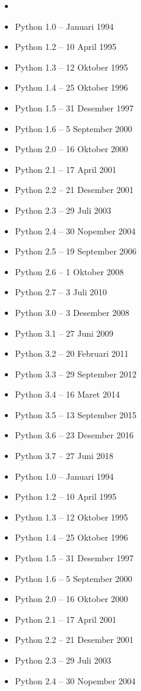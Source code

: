 \begin{itemize}
    \item 
\item    Python 1.0 – Januari 1994
\item	 Python 1.2 – 10 April 1995
\item    Python 1.3 – 12 Oktober 1995
\item    Python 1.4 – 25 Oktober 1996
\item 	 Python 1.5 – 31 Desember 1997
\item    Python 1.6 – 5 September 2000
\item  	 Python 2.0 – 16 Oktober 2000
\item 	 Python 2.1 – 17 April 2001
\item 	 Python 2.2 – 21 Desember 2001
\item  	 Python 2.3 – 29 Juli 2003
\item 	 Python 2.4 – 30 Nopember 2004
\item 	 Python 2.5 – 19 September 2006
\item 	 Python 2.6 – 1 Oktober 2008
\item    Python 2.7 – 3 Juli 2010
\item 	 Python 3.0 – 3 Desember 2008
\item 	 Python 3.1 – 27 Juni 2009
\item 	 Python 3.2 – 20 Februari 2011
\item 	 Python 3.3 – 29 September 2012
\item 	 Python 3.4 – 16 Maret 2014
\item 	 Python 3.5 – 13 September 2015
\item 	 Python 3.6 – 23 Desember 2016
\item 	 Python 3.7 – 27 Juni 2018
\item	 Python 1.0 – Januari 1994
\item	 Python 1.2 – 10 April 1995
\item	 Python 1.3 – 12 Oktober 1995
\item	 Python 1.4 – 25 Oktober 1996
\item	 Python 1.5 – 31 Desember 1997
\item	 Python 1.6 – 5 September 2000
\item	 Python 2.0 – 16 Oktober 2000
\item	 Python 2.1 – 17 April 2001
\item	 Python 2.2 – 21 Desember 2001
\item	 Python 2.3 – 29 Juli 2003
\item  	 Python 2.4 – 30 Nopember 2004

\end{itemize}

